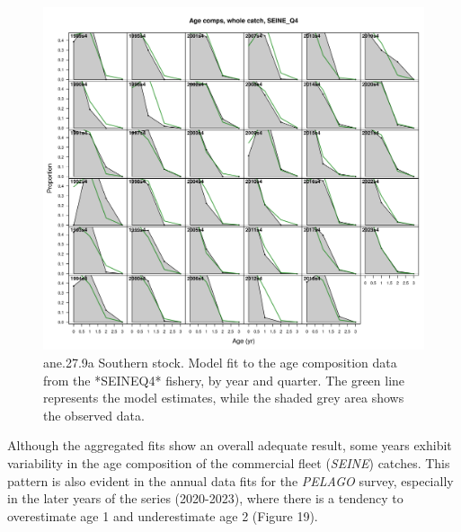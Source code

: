\documentclass[
]{article}
\begin{document}
\begin{figure}[H]

{\centering \includegraphics[width=0.95\linewidth]{report/run/S1.0_4FLEETS_SelECO_RecIndex_Mnewfix/fig_age_fit_SeineQ4} 

}

\caption{ane.27.9a Southern stock. Model fit to the age composition data from the *SEINEQ4* fishery, by year and quarter. The green line represents the model estimates, while the shaded grey area shows the observed data.}\label{fig:unnamed-chunk-48}
\end{figure}

Although the aggregated fits show an overall adequate result, some years
exhibit variability in the age composition of the commercial fleet
(\emph{SEINE}) catches. This pattern is also evident in the annual data
fits for the \emph{PELAGO} survey, especially in the later years of the
series (2020-2023), where there is a tendency to overestimate age 1 and
underestimate age 2 (Figure 19).
\end{document}
